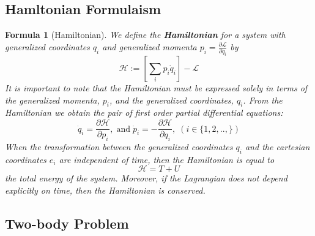 \documentclass[12pt]{article}
\newtheorem{for}[thm]{Formula}
\theoremstyle{definition}
\theoremstyle{remark}
\numberwithin{equation}{section}
\begin{document}
\subsection{Hamltonian Formulaism}

\begin{for}[Hamiltonian]
        We define the \textbf{Hamiltonian} for a system with generalized coordinates $q_i$ and generalized momenta $p_i = \frac{\partial \mathcal{L}}{\partial \dot{q_i}}$ by \begin{equation}
                \mathcal{H} := \left[\sum\limits_{i}p_i\dot{q}_i\right]-\mathcal{L}
        \end{equation}
        It is important to note that the Hamiltonian must be expressed solely in terms of the generalized momenta, $p_i$, and the generalized coordinates, $q_i$. From the Hamiltonian we obtain the pair of first order partial differential equations: \begin{equation}
                \dot{q}_i = \frac{\partial \mathcal{H}}{\partial p_i}, \;\text{and}\;\dot{p}_i = -\frac{\partial \mathcal{H}}{\partial q_i},\; (i \in \{1,2,..,\})
        \end{equation}
        When the transformation between the generalized coordinates $q_i$ and the cartesian coordinates $e_i$ are independent of time, then the Hamiltonian is equal to \begin{equation}
                \mathcal{H} = T + U
        \end{equation}
        the total energy of the system. Moreover, if the Lagrangian does not depend explicitly on time, then the Hamiltonian is conserved.
\end{for}


\vspace{15pt}

\subsection{Two-body Problem}
\end{document}
